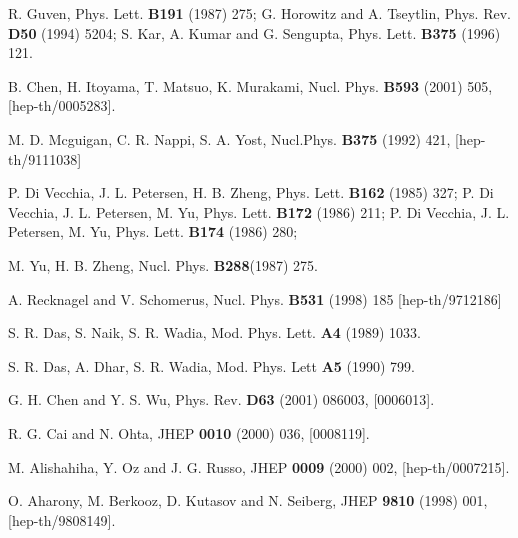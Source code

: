 \documentclass[a4paper,12pt]{article}
\begin{document}
\begin{thebibliography}{99}
 R. Guven, Phys. Lett. {\bf B191} (1987) 275;
  G. Horowitz and A. Tseytlin, Phys. Rev. {\bf D50} (1994) 5204; 
  S. Kar, A. Kumar and G. Sengupta, Phys. Lett. {\bf B375} (1996) 121. 

B. Chen, H. Itoyama, T. Matsuo, K. Murakami,  
         Nucl. Phys. {\bf B593} (2001) 505, [hep-th/0005283]. 


M. D. Mcguigan, C. R. Nappi, S. A. Yost, 
Nucl.Phys. {\bf B375} (1992) 421, [hep-th/9111038]

 P. Di Vecchia, J. L. Petersen, H. B. Zheng, 
Phys. Lett. {\bf B162} (1985) 327; P. Di Vecchia, J. L. Petersen, 
M. Yu, Phys. Lett. {\bf B172} (1986) 211;
P. Di Vecchia, J. L. Petersen, M. Yu, Phys. Lett. {\bf B174} (1986)
280; 

 M. Yu, H. B. Zheng, Nucl. Phys. {\bf B288}(1987) 275. 

A. Recknagel and V. Schomerus, Nucl. Phys. 
{\bf B531} (1998) 185 [hep-th/9712186]

S. R. Das, S. Naik, S. R. Wadia, Mod. Phys. Lett. {\bf A4} 
(1989) 1033.


S. R. Das, A. Dhar, S. R. Wadia, Mod. Phys. Lett {\bf A5} 
(1990) 799.

G. H. Chen and Y. S. Wu, Phys. Rev. {\bf D63} (2001) 
086003, [0006013].

R. G. Cai and N. Ohta, JHEP {\bf 0010} (2000) 036,
[0008119].

M. Alishahiha, Y. Oz and J. G. Russo, JHEP 
{\bf 0009} (2000) 002, [hep-th/0007215].

O. Aharony, M. Berkooz, D. Kutasov and N. Seiberg, 
JHEP {\bf 9810} (1998) 001, [hep-th/9808149].

\end{thebibliography}

\end{document}
